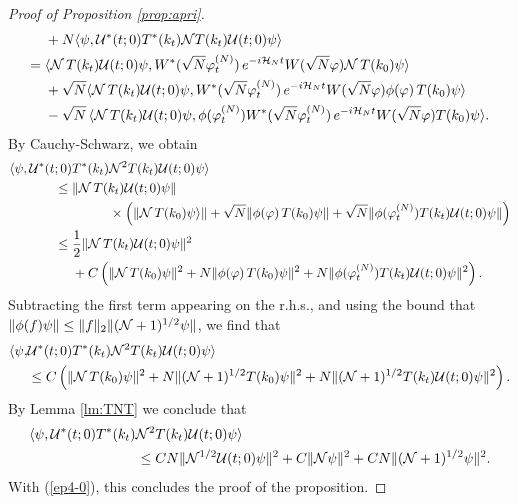 \documentclass[11pt,a4paper]{article}
\newcommand{\cU}{{\cal U}}
\newcommand{\cH}{{\cal H}}
\newcommand{\cN}{{\cal N}}
\begin{document}
\begin{proof}[Proof of Proposition \ref{prop:apri}]
\begin{equation}
\begin{split}
 &+ N  \langle \psi, \cU^* (t;0)  T^* (k_t) \cN T (k_t) \cU (t;0) \psi \rangle \\
 = \; &  \langle \cN \, T (k_t) \cU (t;0) \psi,  W^* (\sqrt{N} \varphi_t^{(N)}) \,  e^{-i \cH_N t} W (\sqrt{N} \varphi)  \cN \, T (k_0) \psi \rangle \\ &+\sqrt{N} \langle \cN \, T (k_t) \cU (t;0) \psi,  W^* (\sqrt{N} \varphi_t^{(N)}) \,  e^{-i \cH_N t} W (\sqrt{N} \varphi)  \phi (\varphi) \, T (k_0) \psi \rangle \\
 &-\sqrt{N} \, \langle \cN \, T (k_t) \cU (t;0) \psi,  \phi (\varphi_t^{(N)})  W^* (\sqrt{N} \varphi_t^{(N)}) \, e^{-i \cH_N t}  W (\sqrt{N} \varphi) T (k_0) \psi \rangle.
\end{split} \end{equation}
By Cauchy-Schwarz, we obtain 
\[ \begin{split} 
\langle \psi , \cU^* (t;0) &T^* (k_t) \cN^2  T(k_t) \cU (t;0) \psi \rangle \\ \leq \; & \| \cN \, T (k_t) \cU (t;0) \psi \|\\ & \hspace{1cm} \times  \left(  \| \cN \, T (k_0) \psi \rangle \| + \sqrt{N} \| \phi (\varphi) \, T (k_0) \psi \| + \sqrt{N} \|  \phi (\varphi_t^{(N)}) T (k_t) \cU (t;0)  \psi \| \right) \\ \leq \; & \frac{1}{2} \| \cN \, T (k_t) \cU (t;0) \psi \|^2 \\ &+ C \left( \|
\cN \, T (k_0) \psi \|^2 + N \| \phi (\varphi) \, T (k_0) \psi \|^2 + N \|  \phi (\varphi_t^{(N)}) T (k_t) \cU (t;0)  \psi \|^2 \right). 
\end{split} \]
Subtracting the first term appearing on the r.h.s., and using the bound that $\| \phi (f) \psi \| \leq \| f \|_2 \| (\cN+1)^{1/2} \psi \|$, we find that
\[ \begin{split} \langle \psi , & \cU^* (t;0) T^* (k_t) \cN^2  T(k_t) \cU (t;0) \psi \rangle \\ & \leq C \left( \|
\cN \, T(k_0)  \psi \|^2 + N \| (\cN+1)^{1/2} T(k_0) \psi \|^2 + N \| (\cN+1)^{1/2} T(k_t) \cU (t;0)  \psi \|^2 \right).  \end{split} \]
By Lemma \ref{lm:TNT} we conclude that 
\[ \begin{split} \langle \psi , \cU^* (t;0) T^* (k_t)  \cN^2 &T (k_t) \cU (t;0) \psi \rangle \\ \leq \; &C N  \| \cN^{1/2}  \cU (t;0) \psi \|^2 + C \| \cN \psi \|^2 + CN \| (\cN+1)^{1/2} \psi \|^2 . \end{split} \]
With (\ref{ep4-0}), this concludes the proof of the proposition.
\end{proof}
\end{document}

